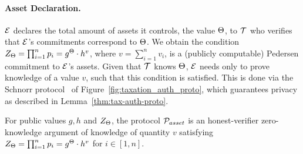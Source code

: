 \paragraph{Asset Declaration.}\label{subsec:tax-authority-proto}
 $\mathcal{E}$ declares the total amount of assets
it controls, \ie the value $\Theta$,
to  $\mathcal{T}$ who verifies  that $\mathcal{E}$'s commitments
correspond to $\Theta$. We obtain the condition
$Z_\Theta = \prod_{i = 1}^n p_i = g^{\Theta} \cdot h^v$,
where $v = {\sum_{i = 1}^n v_i}$, is a (publicly
computable) Pedersen commitment to $\mathcal{E}$'s assets. Given that $\mathcal{T}$
knows $\Theta$, $\mathcal{E}$ needs only to prove knowledge of a value $v$, such
that this condition is satisfied. This is done via the Schnorr
protocol~\cite{C:Schnorr89} of Figure~\ref{fig:taxation_auth_proto}, which
guarantees privacy as described in Lemma~\ref{thm:tax-auth-proto}.



\begin{lemma}\label{thm:tax-auth-proto}
    For public values $g, h$ and $Z_\Theta$, the protocol $\mathcal{P}_{asset}$ is an
    honest-verifier zero-knowledge argument of knowledge of quantity $v$
    satisfying
    $Z_\Theta = \prod_{i = 1}^n p_i = g^{\Theta} \cdot h^v$ for $i \in [1, n]$.
\end{lemma}


